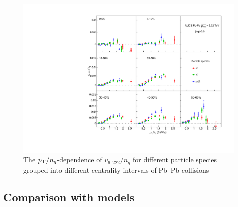 \begin{figure}[!htb]
\begin{center}
\includegraphics[scale=0.82]{figures/scaling/All_v6222_gap00_NCQ_3by3.pdf}

\end{center}
\caption{The $p_{\rm{T}}/n_{q}$-dependence of $v_{6,222}/n_{q}$ for different particle species grouped into different centrality intervals of Pb--Pb collisions \sNN}
\label{v6222_NCQ}
\end{figure}



\newpage
\subsection{Comparison with models}
\label{SubSec:hydro}

